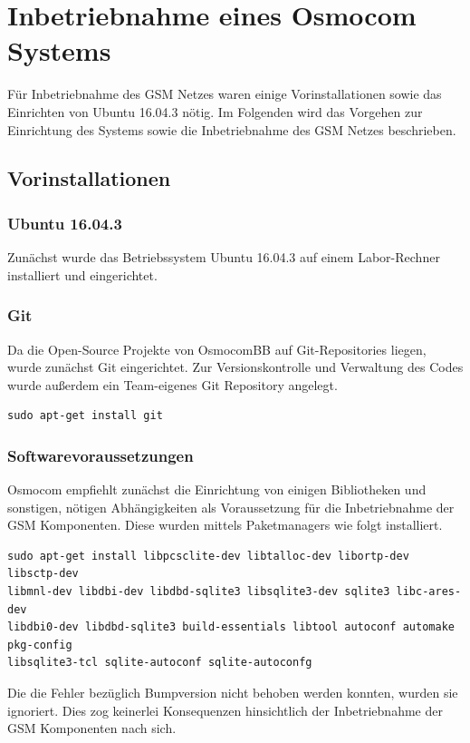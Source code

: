 
\section{Inbetriebnahme eines Osmocom Systems}
Für Inbetriebnahme des GSM Netzes waren einige Vorinstallationen sowie das Einrichten von Ubuntu 16.04.3 nötig. Im Folgenden wird das Vorgehen zur Einrichtung des Systems sowie die Inbetriebnahme des GSM Netzes beschrieben.

\subsection{Vorinstallationen}

\subsubsection{Ubuntu 16.04.3}
Zunächst wurde das Betriebssystem Ubuntu 16.04.3 auf einem Labor-Rechner installiert und eingerichtet.

\subsubsection{Git}
Da die Open-Source Projekte von OsmocomBB auf Git-Repositories liegen, wurde zunächst Git eingerichtet. Zur Versionskontrolle und Verwaltung des Codes wurde außerdem ein Team-eigenes Git Repository angelegt.

\begin{lstlisting}
sudo apt-get install git
\end{lstlisting}

\subsubsection{Softwarevoraussetzungen}
Osmocom empfiehlt zunächst die Einrichtung von einigen Bibliotheken und sonstigen, nötigen Abhängigkeiten als Voraussetzung für die Inbetriebnahme der GSM Komponenten. Diese wurden mittels Paketmanagers wie folgt installiert.

\begin{lstlisting}
sudo apt-get install libpcsclite-dev libtalloc-dev libortp-dev libsctp-dev 
libmnl-dev libdbi-dev libdbd-sqlite3 libsqlite3-dev sqlite3 libc-ares-dev 
libdbi0-dev libdbd-sqlite3 build-essentials libtool autoconf automake pkg-config 
libsqlite3-tcl sqlite-autoconf sqlite-autoconfg
\end{lstlisting}

Die die Fehler bezüglich Bumpversion nicht behoben werden konnten, wurden sie ignoriert. Dies zog keinerlei Konsequenzen hinsichtlich der Inbetriebnahme der GSM Komponenten nach sich.

